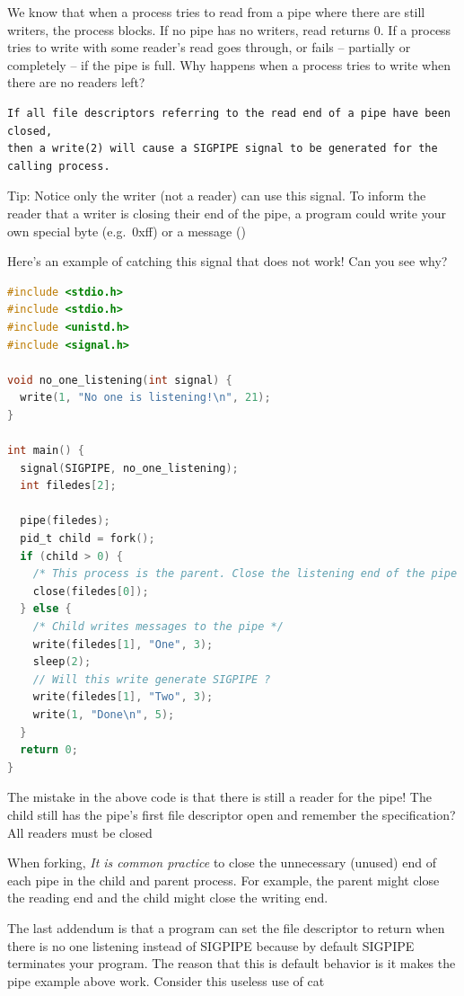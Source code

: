We know that when a process tries to read from a pipe where there are still writers, the process blocks.
If no pipe has no writers, read returns 0.
If a process tries to write with some reader's read goes through, or fails -- partially or completely -- if the pipe is full.
Why happens when a process tries to write when there are no readers left?

\begin{verbatim}
If all file descriptors referring to the read end of a pipe have been closed,
then a write(2) will cause a SIGPIPE signal to be generated for the calling process.
\end{verbatim}

Tip: Notice only the writer (not a reader) can use this signal.
To inform the reader that a writer is closing their end of the pipe, a program could write your own special byte (e.g.~0xff) or a message ()

Here's an example of catching this signal that does not work! Can you see why?

\begin{lstlisting}[language=C]
#include <stdio.h>
#include <stdio.h>
#include <unistd.h>
#include <signal.h>

void no_one_listening(int signal) {
  write(1, "No one is listening!\n", 21);
}

int main() {
  signal(SIGPIPE, no_one_listening);
  int filedes[2];

  pipe(filedes);
  pid_t child = fork();
  if (child > 0) {
    /* This process is the parent. Close the listening end of the pipe */
    close(filedes[0]);
  } else {
    /* Child writes messages to the pipe */
    write(filedes[1], "One", 3);
    sleep(2);
    // Will this write generate SIGPIPE ?
    write(filedes[1], "Two", 3);
    write(1, "Done\n", 5);
  }
  return 0;
}
\end{lstlisting}

The mistake in the above code is that there is still a reader for the pipe!
The child still has the pipe's first file descriptor open and remember the specification? All readers must be closed

When forking, \emph{It is common practice} to close the unnecessary (unused) end of each pipe in the child and parent process.
For example, the parent might close the reading end and the child might close the writing end.

The last addendum is that a program can set the file descriptor to return when there is no one listening instead of SIGPIPE because by default SIGPIPE terminates your program.
The reason that this is default behavior is it makes the pipe example above work.
Consider this useless use of cat

